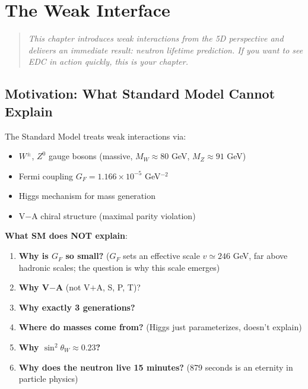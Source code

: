 \chapter{The Weak Interface}
\label{ch:weak_interface}

\begin{quote}
\textit{This chapter introduces weak interactions from the 5D perspective
and delivers an immediate result: neutron lifetime prediction.
If you want to see EDC in action quickly, this is your chapter.}
\end{quote}

\section{Motivation: What Standard Model Cannot Explain}
\label{sec:weak_motivation}

The Standard Model treats weak interactions via:
\begin{itemize}[nosep]
\item $W^\pm$, $Z^0$ gauge bosons (massive, $M_W \approx 80$ GeV, $M_Z \approx 91$ GeV)
\item Fermi coupling $G_F = 1.166 \times 10^{-5}$ GeV$^{-2}$ \tagBL{}
\item Higgs mechanism for mass generation
\item V$-$A chiral structure (maximal parity violation)
\end{itemize}

\textbf{What SM does NOT explain}:
\begin{enumerate}[nosep]
\item \textbf{Why is $G_F$ so small?} ($G_F$ sets an effective scale $v \simeq 246$ GeV,
      far above hadronic scales; the question is why this scale emerges)
\item \textbf{Why V$-$A} (not V$+$A, S, P, T)?
\item \textbf{Why exactly 3 generations?}
\item \textbf{Where do masses come from?} (Higgs just parameterizes, doesn't explain)
\item \textbf{Why $\sin^2\theta_W \approx 0.23$?}
\item \textbf{Why does the neutron live 15 minutes?} (879 seconds is an eternity in particle physics)
\end{enumerate}

